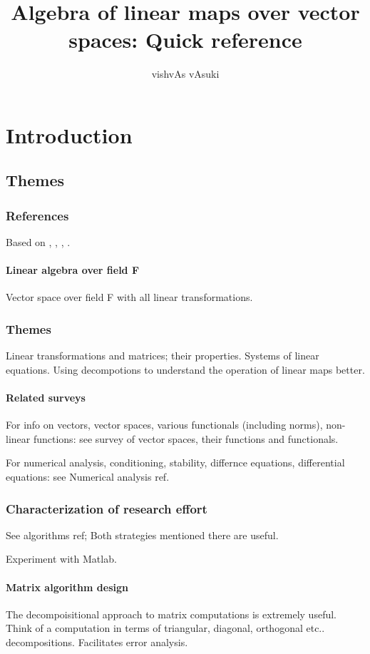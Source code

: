 \documentclass[oneside, article]{memoir}
\title{Algebra of linear maps over vector spaces: Quick reference}
\author{vishvAs vAsuki}
\begin{document}
\maketitle

\tableofcontents

\part{Introduction}
\chapter{Themes}
\section{References}
Based on \cite{strang}, \cite{trefBau}, \cite{hornJohnson} \cite{hornJohnsonTopics}, \cite{matrixCookbook}.

\subsection{Linear algebra over field F}
Vector space over field F with all linear transformations.

\section{Themes}
Linear transformations and matrices; their properties. Systems of linear equations. Using decompotions to understand the operation of linear maps better.

\subsection{Related surveys}
For info on vectors, vector spaces, various functionals (including norms), non-linear functions: see survey of vector spaces, their functions and functionals.

For numerical analysis, conditioning, stability, differnce equations, differential equations: see Numerical analysis ref.


\section{Characterization of research effort}
See algorithms ref; Both strategies mentioned there are useful.

Experiment with Matlab.

\subsection{Matrix algorithm design}
The decompoisitional approach to matrix computations is extremely useful. Think of a computation in terms of triangular, diagonal, orthogonal etc.. decompositions. Facilitates error analysis.
\end{document}

